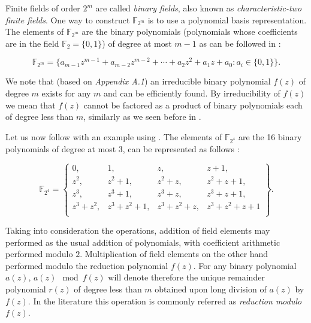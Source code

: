 Finite fields of order $2^m$ are called \textit{binary fields}, also known as \textit{characteristic-two finite fields}. One way to construct $\mathbb{F}_{2^m}$ is to use a polynomial basis representation. The elements of $\mathbb{F}_{2^m}$ are the binary polynomials (polynomials whose coefficients are in the field $\mathbb{F}_2 = \{0,1\}$) of degree at most $m-1$ as can be followed in :

\begin{equation}
	\mathbb{F}_{2^m} = \{ a_{m-1} z^{m-1} + a_{m-2} z^{m-2} + \cdots + a_2 z^2 + a_1 z + a_0 : a_i \in \{0, 1\} \}.
	\label{eq:ch1.binaryField}
\end{equation}

We note that (based on \textit{Appendix A.1}\cite{menezes2004ECC}) an irreducible binary polynomial $f(z)$ of degree $m$
exists for any $m$ and can be efficiently found. By irreducibility of $f(z)$ we mean that $f(z)$ cannot be factored as a product of binary polynomials each of degree less than $m$, similarly as we seen before in  .

\begin{example}
	\label{ex:ch01.binaryFieldF24}
	Let us now follow with an example using . The elements of $\mathbb{F}_{2^4}$ are the 16 binary polynomials of degree at most 3, can be represented as follows \cite{menezes2004ECC}:
	
	\begin{equation}
		\mathbb{F}_{2^4} = \left\{
		\begin{array}{llll}
			0,          & 1,              & z,          & z+1,          \\[4pt]
			z^2,        & z^2+1,          & z^2+z,      & z^2+z+1,      \\[4pt]
			z^3,        & z^3+1,          & z^3+z,      & z^3+z+1,      \\[4pt]
			z^3+z^2,    & z^3+z^2+1,      & z^3+z^2+z,  & z^3+z^2+z+1   \\[4pt]
		\end{array}
		\right\}.
		\label{eq:ch1.F24elements}
	\end{equation}
\end{example}

Taking into consideration the operations, addition of field elements may performed as the usual addition of polynomials, with coefficient arithmetic performed modulo $2$. Multiplication of field elements on the other hand performed modulo the reduction 
polynomial $f(z)$. For any binary polynomial $a(z)$, $a(z) \mod f(z)$  will denote therefore the unique remainder polynomial $r(z)$ of degree less than $m$ obtained upon long division of $a(z)$
by $f(z)$. In the literature this operation is commonly referred as \textit{reduction modulo} $f(z)$.

